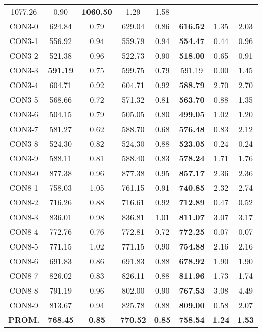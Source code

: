 \begin{table}[ht]
\begin{tabular}{c c c c c c c c}
1077.26 & 0.90 & \bf{1060.50} & 
1.29 & 1.58\\CON3-0 & 624.84 & 0.79 & 
629.04 & 0.86 & \bf{616.52} & 
1.35 & 2.03\\CON3-1 & 556.92 & 0.94 & 
559.79 & 0.94 & \bf{554.47} & 
0.44 & 0.96\\CON3-2 & 521.38 & 0.96 & 
522.73 & 0.90 & \bf{518.00} & 
0.65 & 0.91\\CON3-3 & \bf{591.19} & 0.75 & 
599.75 & 0.79 & 591.19 & 0.00
 & 1.45\\CON3-4 & 604.71 & 0.92 & 
604.71 & 0.92 & \bf{588.79} & 
2.70 & 2.70\\CON3-5 & 568.66 & 0.72 & 
571.32 & 0.81 & \bf{563.70} & 
0.88 & 1.35\\CON3-6 & 504.15 & 0.79 & 
505.05 & 0.80 & \bf{499.05} & 
1.02 & 1.20\\CON3-7 & 581.27 & 0.62 & 
588.70 & 0.68 & \bf{576.48} & 
0.83 & 2.12\\CON3-8 & 524.30 & 0.82 & 
524.30 & 0.88 & \bf{523.05} & 
0.24 & 0.24\\CON3-9 & 588.11 & 0.81 & 
588.40 & 0.83 & \bf{578.24} & 
1.71 & 1.76\\CON8-0 & 877.38 & 0.96 & 
877.38 & 0.95 & \bf{857.17} & 
2.36 & 2.36\\CON8-1 & 758.03 & 1.05 & 
761.15 & 0.91 & \bf{740.85} & 
2.32 & 2.74\\CON8-2 & 716.26 & 0.88 & 
716.61 & 0.92 & \bf{712.89} & 
0.47 & 0.52\\CON8-3 & 836.01 & 0.98 & 
836.81 & 1.01 & \bf{811.07} & 
3.07 & 3.17\\CON8-4 & 772.76 & 0.76 & 
772.81 & 0.72 & \bf{772.25} & 
0.07 & 0.07\\CON8-5 & 771.15 & 1.02 & 
771.15 & 0.90 & \bf{754.88} & 
2.16 & 2.16\\CON8-6 & 691.83 & 0.86 & 
691.83 & 0.88 & \bf{678.92} & 
1.90 & 1.90\\CON8-7 & 826.02 & 0.83 & 
826.11 & 0.88 & \bf{811.96} & 
1.73 & 1.74\\CON8-8 & 791.19 & 0.96 & 
802.00 & 0.90 & \bf{767.53} & 
3.08 & 4.49\\CON8-9 & 813.67 & 0.94 & 
825.78 & 0.88 & \bf{809.00} & 
0.58 & 2.07\\\bf{PROM.} & 
\bf{768.45} & \bf{0.85} & \bf{770.52} & \bf{0.85} & \bf{758.54} & \bf{1.24} & \bf{1.53}\\[1ex]\hline
\end{tabular}
\label{table:nonlin}
\end{table} 

